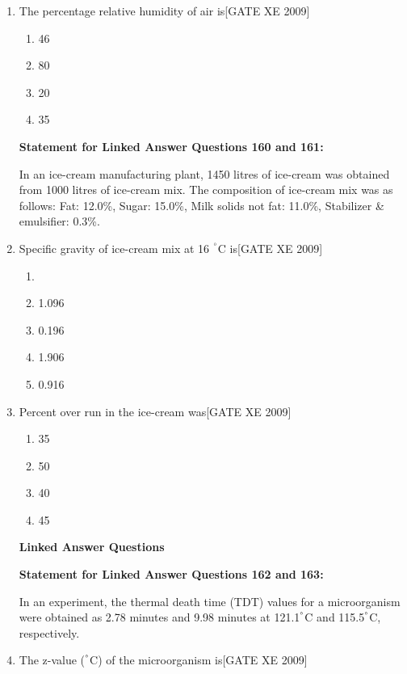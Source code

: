 \documentclass[journal,12pt,onecolumn]{IEEEtran}
\theoremstyle{remark}
\begin{document}
\begin{enumerate}
\item The percentage relative humidity of air is\hfill[GATE XE 2009]

\begin{multicols}{2}
\begin{enumerate}
\item 46
\item 80
\item 20
\item 35
\end{enumerate}
\end{multicols}

\noindent\textbf{Statement for Linked Answer Questions 160 and 161:}

In an ice-cream manufacturing plant, 1450 litres of ice-cream was obtained from 1000 litres of ice-cream mix.
The composition of ice-cream mix was as follows:
Fat: 12.0\%,
Sugar: 15.0\%,
Milk solids not fat: 11.0\%,
Stabilizer \& emulsifier: 0.3\%.

\item Specific gravity of ice-cream mix at 16 $^\degree$C is\hfill[GATE XE 2009]
\begin{enumerate}
    \item 

 \item  1.096
 \item  0.196
 \item  1.906
 \item  0.916
\end{enumerate}
\item Percent over run in the ice-cream was\hfill[GATE XE 2009]
\begin{enumerate}
 \item  35
 \item  50
 \item  40
 \item  45
\end{enumerate}






\noindent\textbf{Linked Answer Questions}

\noindent\textbf{Statement for Linked Answer Questions 162 and 163:}


In an experiment, the thermal death time (TDT) values for a microorganism were obtained as 2.78 minutes and 9.98 minutes at 121.1$^\degree$C and 115.5$^\degree$C, respectively.



\item The z-value ($^\degree$C) of the microorganism is\hfill[GATE XE 2009]


\end{enumerate}
\end{document}
